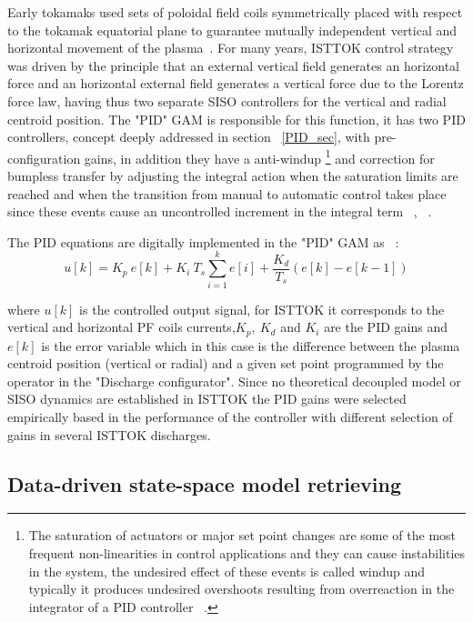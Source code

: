 Early tokamaks used sets of poloidal field coils symmetrically placed with respect to the tokamak equatorial plane to guarantee mutually independent vertical and horizontal movement of the plasma~\cite[Chapter~1]{PirontiBook}. For many years, ISTTOK control strategy was driven by the principle that an external vertical field  generates an horizontal force and an horizontal external field generates a vertical force due to the Lorentz force law, having thus two separate SISO controllers for the vertical and radial centroid position. The "PID" GAM is responsible for this function, it has two PID  controllers, concept deeply addressed in section ~\ref{PID_sec},   with pre-configuration gains, in addition they have a   anti-windup \footnote{The saturation of actuators or major set point changes are some  of the most frequent non-linearities in control applications and they can cause instabilities in the system, the undesired effect of these events is called windup and typically it produces undesired overshoots resulting from overreaction in the integrator of a PID controller ~\cite[Chapter~1]{Hippe2011}.} and correction for bumpless transfer by adjusting the integral action when the saturation limits are reached and  when the transition from manual to automatic control takes place since these events cause an uncontrolled increment in the integral term  ~\cite[Chapter~3]{Yu2011}, ~\cite{Vrancic1996}. \smallskip  

The PID equations are digitally implemented in the "PID" GAM as ~\cite[Chapter~1]{Yu2011}: 
\begin{equation}
	u[k]=K_p~e[k]+ K_i~T_s\sum_{i=1}^{k}e[i]+\frac{K_d}{T_s}(e[k]-e[k-1])
\end{equation}

where $u[k]$ is the controlled output signal, for ISTTOK it corresponds to the vertical and horizontal PF coils currents,$K_p,~K_d$ and $K_i$ are the PID gains and $e[k]$ is the error variable which in this case is the difference between the plasma centroid position (vertical or radial) and  a given set point programmed by the operator in the "Discharge configurator".  Since no theoretical decoupled model or SISO dynamics are established in ISTTOK the PID gains were selected empirically based in the performance of the controller with different selection of gains in several ISTTOK discharges.

\subsection{Data-driven state-space model retrieving }


